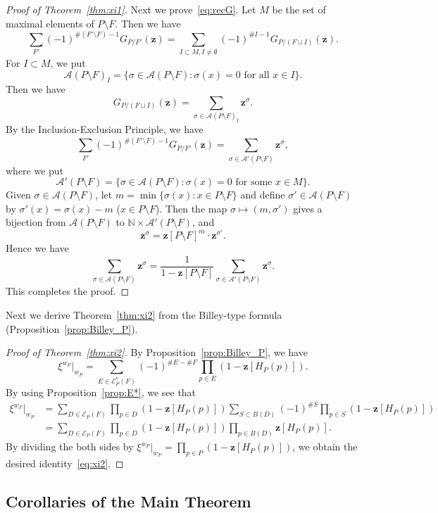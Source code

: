 \documentclass[ALCO,ThmDefs,Unicode,epreuves]{cedram}
\newcommand\vectz{\boldsymbol{z}}
\newcommand\Nat{\mathbb{N}}
\newcommand\AP{\mathcal{A}}
\newcommand\EE{\mathcal{E}}
\begin{document}
\begin{proof}[Proof of Theorem~\ref{thm:xi1}]
Next we prove~\eqref{eq:recG}.
Let $M$ be the set of maximal elements of $P \setminus F$.
Then we have
$$
\sum_{F'}
 (-1)^{\# (F' \setminus F) -1 }
 G_{P/F'}(\vectz)
 =
\sum_{I \subset M, I \neq \emptyset}
 (-1)^{\# I - 1}
 G_{P/(F \sqcup I)}(\vectz).
$$
For $I \subset M$, we put
$$
\AP(P \setminus F)_I 
 =
\{ \sigma \in \AP(P \setminus F) : \sigma(x) = 0 \text{ for all $x \in I$} \}.
$$
Then we have
$$
G_{P/(F \sqcup I)}(\vectz) = \sum_{\sigma \in \AP(P \setminus F)_I} \vectz^\sigma.
$$
By the Inclusion-Exclusion Principle, we have
$$
\sum_{F'}
 (-1)^{\# (F' \setminus F) -1 }
 G_{P/F'}(\vectz)
 =
\sum_{\sigma \in \AP'(P \setminus F)} \vectz^\sigma,
$$
where we put
$$
\AP'(P \setminus F)
 =
\{ \sigma \in \AP(P \setminus F) :
 \text{$\sigma(x) = 0$ for some $x \in M$}
\}.
$$
Given $\sigma \in \AP(P \setminus F)$, let $m = \min \{ \sigma(x) : x \in P \setminus F \}$ 
and define $\sigma' \in \AP(P \setminus F)$ by $\sigma'(x) = \sigma(x) - m$ ($x \in P \setminus F$).
Then the map $\sigma \mapsto (m, \sigma')$ gives a bijection from $\AP(P \setminus F)$ 
to $\Nat \times \AP'(P \setminus F)$, and
$$
\vectz^\sigma = \vectz[P \setminus F]^m \cdot \vectz^{\sigma'}.
$$
Hence we have
$$
\sum_{\sigma \in \AP(P \setminus F)} \vectz^\sigma
 =
\frac{ 1 }
 { 1 - \vectz[P \setminus F] }
\sum_{\sigma \in \AP'(P \setminus F)} \vectz^\sigma.
$$
This completes the proof.
\end{proof}

Next we derive Theorem~\ref{thm:xi2} from the Billey-type formula (Proposition~\ref{prop:Billey_P}).

\begin{proof}[Proof of Theorem~\ref{thm:xi2}]
By Proposition~\ref{prop:Billey_P}, we have
$$
\xi^{w_F}|_{w_P}
 =
\sum_{E \in \EE^*_P(F)}
 (-1)^{\# E - \# F}
 \prod_{p \in E} \left( 1 - \vectz[H_P(p)] \right).
$$
By using Proposition~\ref{prop:E*}, we see that
\begin{align*}
\xi^{w_F}|_{w_P}
 &=
\sum_{D \in \EE_P(F)}
 \prod_{p \in D} \left( 1 - \vectz[H_P(p)] \right)
\sum_{S \subset B(D)}
 (-1)^{\# S}
 \prod_{p \in S} \left( 1 - \vectz[H_P(p)] \right)
\\
 &=
\sum_{D \in \EE_P(F)}
 \prod_{p \in D} \left( 1 - \vectz[H_P(p)] \right)
 \prod_{p \in B(D)} \vectz[H_P(p)].
\end{align*}
By dividing the both sides by $\xi^{w_P}|_{w_P} = \prod_{p \in P} ( 1 - \vectz[H_P(p)] )$, 
we obtain the desired identity~\eqref{eq:xi2}.
\end{proof}

\subsection{%
Corollaries of the Main Theorem
}
\end{document}
